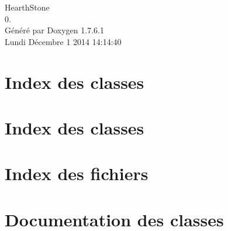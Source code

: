 \documentclass[a4paper]{book}
\begin{document}
\hypersetup{pageanchor=false,citecolor=blue}
\begin{titlepage}
\vspace*{7cm}
\begin{center}
{\Large \-Hearth\-Stone \\[1ex]\large 0. }\\
\vspace*{1cm}
{\large \-Généré par Doxygen 1.7.6.1}\\
\vspace*{0.5cm}
{\small Lundi Décembre 1 2014 14:14:40}\\
\end{center}
\end{titlepage}
\clearemptydoublepage
{}
\tableofcontents
\clearemptydoublepage
{}
\hypersetup{pageanchor=true,citecolor=blue}
\chapter{\-Index des classes}

\chapter{\-Index des classes}

\chapter{\-Index des fichiers}

\chapter{\-Documentation des classes}



























\end{document}
